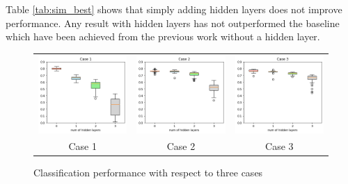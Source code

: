 \documentclass{article}
\begin{document}
Table \ref{tab:sim_best} shows that simply adding hidden layers does not improve performance. Any result with hidden layers has not outperformed the baseline which have been achieved from the previous work \cite{hopkins2018spiking} without a hidden layer.

\begin{figure}[tbh]
    \centering
    \begin{centering}
    \begin{tabular}{ccc}
        \includegraphics[width=0.30\linewidth, trim=0cm 0cm 0cm 0.65cm, clip=true]{10trials/boxPlotHlayersC1}&
        \includegraphics[width=0.30\linewidth, trim=0cm 0cm 0cm 0.65cm, clip=true]{10trials/boxPlotHlayersC2}&
        \includegraphics[width=0.30\linewidth, trim=0cm 0cm 0cm 0.65cm, clip=true]{10trials/boxPlotHlayersC3}\\
        Case 1 & Case 2 & Case 3
        \end{tabular}
     \end{centering}
     \caption{Classification performance with respect to three cases}
     \label{fig:bpTtime}
    \vspace{-10pt}
\end{figure}
\end{document}
